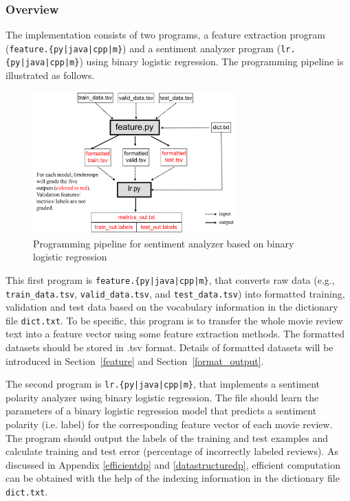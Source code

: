 \documentclass[11pt]{exam}
\numberwithin{equation}{section} %
\numberwithin{figure}{section} %
\numberwithin{table}{section} %
\begin{document}
\subsubsection{Overview}\label{overview}

The implementation consists of two programs, a feature extraction program (\texttt{feature.\{py|java|cpp|m\}}) and a sentiment analyzer program (\texttt{lr.\{py|java|cpp|m\}}) using binary logistic regression. The programming pipeline is illustrated as follows.

\begin{figure}[H]
        \centering
        \includegraphics[width = 0.7\textwidth]{Pipeline.png}
        \caption{Programming pipeline for sentiment analyzer based on binary logistic regression}
        \label{pipeline}
\end{figure}


This first program is \texttt{feature.\{py|java|cpp|m\}}, that converts raw data (e.g., \lstinline{train_data.tsv}, \lstinline{valid_data.tsv}, and \lstinline{test_data.tsv}) into formatted training, validation and test data based on the vocabulary information in the dictionary file \lstinline{dict.txt}. To be specific, this program is to transfer the whole movie review text into a feature vector using some feature extraction methods. The formatted datasets should be stored in .tsv format. Details of formatted datasets will be introduced in Section~\ref{feature} and Section~\ref{format_output}.

The second program is \texttt{lr.\{py|java|cpp|m\}}, that implements a sentiment polarity analyzer using binary logistic regression. The file should learn the parameters of a binary logistic regression model that predicts a sentiment polarity (i.e. label) for the corresponding feature vector of each movie review. The program should output the labels of the training and test examples and calculate training and test error (percentage of incorrectly labeled reviews). As discussed in Appendix \ref{efficientdp} and \ref{datastructuredp}, efficient computation can be obtained with the help of the indexing information in the dictionary file \lstinline{dict.txt}.
\end{document}
